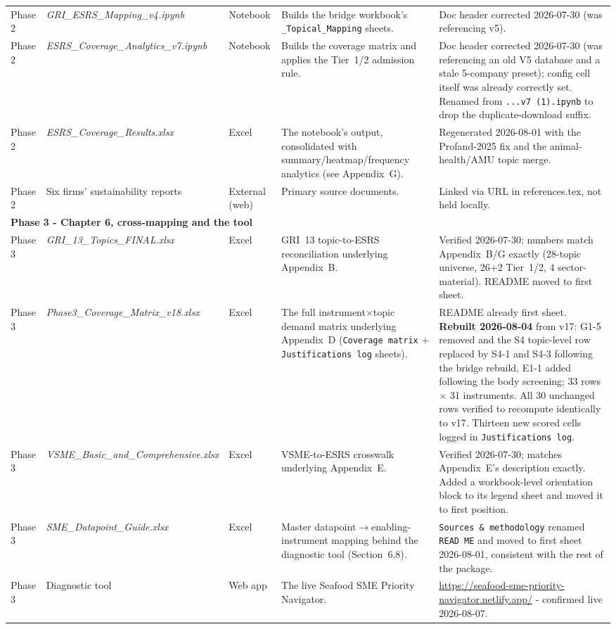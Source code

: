 \documentclass[
]{article}
\newcommand{\fb}{\discretionary{}{}{}} %
\begin{document}
\begin{landscape}
\begin{longtable}{p{2.5cm}p{3.8cm}p{1.0cm}p{5.2cm}p{3.7cm}}
Phase 2 & \emph{GRI\_\fb ESRS\_\fb Mapping\_\fb v4.ipynb} & Notebook & Builds the bridge workbook's \texttt{\_Topical\_Mapping} sheets. & Doc header corrected 2026-07-30 (was referencing v5). \\
Phase 2 & \emph{ESRS\_\fb Coverage\_\fb Analytics\_\fb v7.ipynb} & Notebook & Builds the coverage matrix and applies the Tier~1/2 admission rule. & Doc header corrected 2026-07-30 (was referencing an old V5 database and a stale 5-company preset); config cell itself was already correctly set. Renamed from \texttt{...v7 (1).ipynb} to drop the duplicate-download suffix. \\
Phase 2 & \emph{ESRS\_\fb Coverage\_\fb Results.xlsx} & Excel & The notebook's output, consolidated with summary/heatmap/frequency analytics (see Appendix~G). & Regenerated 2026-08-01 with the Profand-2025 fix and the animal-health/AMU topic merge. \\
Phase 2 & Six firms' sustainability reports & External (web) & Primary source documents. & Linked via URL in references.tex, not held locally. \\
\multicolumn{5}{l}{\rule{0pt}{1.1em}\textbf{Phase 3 - Chapter 6, cross-mapping and the tool}}\\[1pt]
Phase 3 & \emph{GRI\_\fb 13\_\fb Topics\_\fb FINAL.xlsx} & Excel & GRI~13 topic-to-ESRS reconciliation underlying Appendix~B. & Verified 2026-07-30; numbers match Appendix~B/G exactly (28-topic universe, 26+2 Tier~1/2, 4 sector-material). README moved to first sheet. \\
Phase 3 & \emph{Phase3\_\fb Coverage\_\fb Matrix\_\fb v18.xlsx} & Excel & The full instrument$\times$topic demand matrix underlying Appendix~D (\texttt{Coverage matrix} + \texttt{Justifications log} sheets). & README already first sheet. \textbf{Rebuilt 2026-08-04} from v17: G1-5 removed and the S4 topic-level row replaced by S4-1 and S4-3 following the bridge rebuild, E1-1 added following the body screening; 33 rows $\times$ 31 instruments. All 30 unchanged rows verified to recompute identically to v17. Thirteen new scored cells logged in \texttt{Justifications log}. \\
Phase 3 & \emph{VSME\_\fb Basic\_\fb and\_\fb Comprehensive.xlsx} & Excel & VSME-to-ESRS crosswalk underlying Appendix~E. & Verified 2026-07-30; matches Appendix~E's description exactly. Added a workbook-level orientation block to its legend sheet and moved it to first position. \\
Phase 3 & \emph{SME\_\fb Datapoint\_\fb Guide.xlsx} & Excel & Master datapoint$\to$enabling-instrument mapping behind the diagnostic tool (Section~6.8). & \texttt{Sources \& methodology} renamed \texttt{READ ME} and moved to first sheet 2026-08-01, consistent with the rest of the package. \\
Phase 3 & Diagnostic tool & Web app & The live Seafood SME Priority Navigator. & \url{https://seafood-sme-priority-navigator.netlify.app/} - confirmed live 2026-08-07. \\
\bottomrule\end{longtable}\end{landscape}
\end{document}
